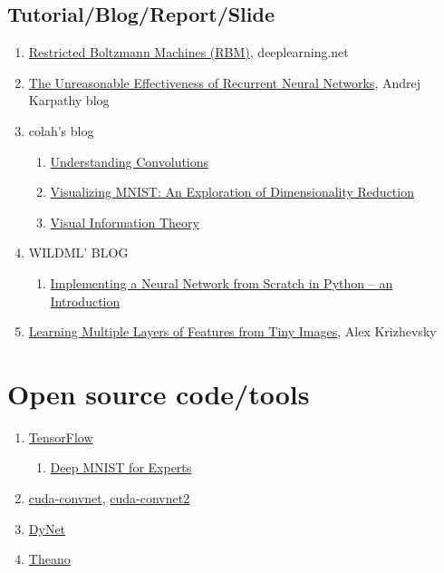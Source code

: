 \documentclass{article}
\begin{document}
\subsection{Tutorial/Blog/Report/Slide}
\begin{enumerate}
	\item \href{http://deeplearning.net/tutorial/rbm.html}{Restricted Boltzmann Machines (RBM)}, deeplearning.net
	\item \href{http://karpathy.github.io/2015/05/21/rnn-effectiveness/}{The Unreasonable Effectiveness of Recurrent Neural Networks}, Andrej Karpathy blog
	\item colah's blog
	      \begin{enumerate}
	      	\item \href{http://colah.github.io/posts/2014-07-Understanding-Convolutions/}{Understanding Convolutions}
	      	\item \href{http://colah.github.io/posts/2014-10-Visualizing-MNIST/}{Visualizing MNIST: An Exploration of Dimensionality Reduction}
	      	\item \href{http://colah.github.io/posts/2015-09-Visual-Information/}{Visual Information Theory}
	      \end{enumerate}
	\item WILDML' BLOG
	      \begin{enumerate}
	      	\item \href{https://www.tensorflow.org/tutorials/mnist/pros/}{Implementing a Neural Network from Scratch in Python – an Introduction}
	      \end{enumerate}
	\item \href{http://www.cs.toronto.edu/~kriz/learning-features-2009-TR.pdf}{Learning Multiple Layers of Features from Tiny Images}, Alex Krizhevsky
\end{enumerate}


\section{Open source code/tools}
\begin{enumerate}
	\item \href{https://www.tensorflow.org/}{TensorFlow}
	      \begin{enumerate}
	      	\item \href{https://www.tensorflow.org/tutorials/mnist/pros/}{Deep MNIST for Experts}
	      \end{enumerate}
	\item \href{https://code.google.com/p/cuda-convnet/}{cuda-convnet}, \href{https://code.google.com/archive/p/cuda-convnet2/}{cuda-convnet2}
	\item \href{https://github.com/clab/dynet}{DyNet}\autocite{dynet}
	\item \href{http://deeplearning.net/software/theano/}{Theano}
\end{enumerate}
\end{document}
